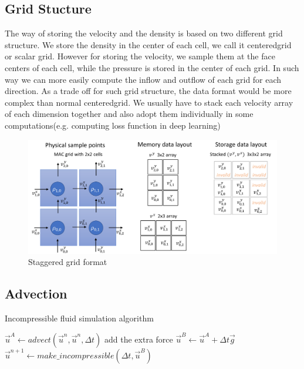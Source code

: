 \documentclass[a4paper,12pt,twoside]{report}
\begin{document}
\subsection{Grid Stucture}
The way of storing the velocity and the density is based on two different grid structure. We store the density in the center of each cell, we call it centeredgrid or scalar grid. However for storing the velocity, we sample them at the face centers of each cell\cite{doi:10.1063/1.1761178}, while the pressure is stored in the center of each grid. In such way we can more easily compute the inflow and outflow of each grid for each direction. As a trade off for such grid structure, the data format would be more complex than normal centeredgrid. We usually have to stack each velocity array of each dimension together and also adopt them individually in some computations(e.g. computing loss function in deep learning)

\begin{figure}[h]
\centering
\includegraphics[width=\textwidth]{Staggered.png}
\caption{Staggered grid format \cite{staggeredform}}
\end{figure}

\subsection{Advection}
\begin{algorithm}
	\caption{Incompressible fluid simulation algorithm}
\begin{algorithmic}
	\STATE $\vec{u}^{A} \gets advect(\vec{u}^{n}, \vec{u}^{n}, \Delta t)$
	\STATE add the extra force $\vec{u}^{B} \gets \vec{u}^{A} + \Delta t\vec{g}$
	\STATE $\vec{u}^{n+1} \gets make\_incompressible(\Delta t, \vec{u}^{B})$
	\ENDFOR
\end{algorithmic}
\end{algorithm}
\end{document}
